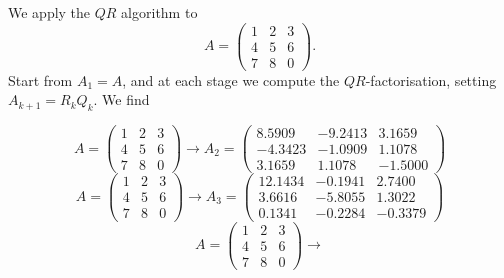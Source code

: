 \documentclass{beamer}
\begin{document}
\begin{frame}
  We apply the $QR$ algorithm to
  \begin{equation*}
    A =
    \begin{pmatrix}
      1 & 2 & 3 \\
      4 & 5 & 6 \\
      7 & 8 & 0
    \end{pmatrix}.
  \end{equation*}
  Start from $A_1 = A$, and at each stage we compute the
  $QR$-factorisation, setting $A_{k+1}  = R_k Q_k$. \pause We find
  \begin{overlayarea}{\textwidth}{0.4\textheight}
    {
      \begin{equation*}
        A =
        \begin{pmatrix}
          1 & 2 & 3 \\
          4 & 5 & 6 \\
          7 & 8 & 0
        \end{pmatrix} \rightarrow
        A_2 =
        \begin{pmatrix}
          8.5909 &  -9.2413  &  3.1659\\
          -4.3423 &  -1.0909 &   1.1078\\
          3.1659  &  1.1078 &  -1.5000
        \end{pmatrix}
      \end{equation*}
    }
    {
      \begin{equation*}
        A =
        \begin{pmatrix}
          1 & 2 & 3 \\
          4 & 5 & 6 \\
          7 & 8 & 0
        \end{pmatrix} \rightarrow
        A_3 =
        \begin{pmatrix}
          12.1434 &  -0.1941 &   2.7400 \\
          3.6616 &  -5.8055 &   1.3022 \\
          0.1341 &  -0.2284 &  -0.3379
        \end{pmatrix}
      \end{equation*}
    }
    {
      \begin{equation*}
        A =
        \begin{pmatrix}
          1 & 2 & 3 \\
          4 & 5 & 6 \\
          7 & 8 & 0
        \end{pmatrix} \rightarrow

\end{equation*}}
\end{overlayarea}
\end{frame}
\end{document}
